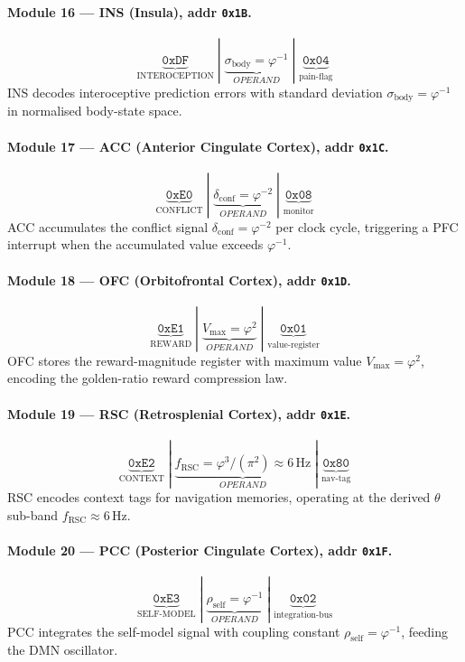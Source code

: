 \paragraph{Module 16 — INS (Insula), addr \texttt{0x1B}.}
\[
  \underbrace{\mathtt{0xDF}}_{\text{INTEROCEPTION}}
  \;|\;
  \underbrace{\sigma_{\text{body}} = \varphi^{-1}}_{OPERAND}
  \;|\;
  \underbrace{\mathtt{0x04}}_{\text{pain-flag}}
\]
INS decodes interoceptive prediction errors with standard
deviation $\sigma_{\text{body}} = \varphi^{-1}$ in normalised body-state
space.

\paragraph{Module 17 — ACC (Anterior Cingulate Cortex), addr \texttt{0x1C}.}
\[
  \underbrace{\mathtt{0xE0}}_{\text{CONFLICT}}
  \;|\;
  \underbrace{\delta_{\text{conf}} = \varphi^{-2}}_{OPERAND}
  \;|\;
  \underbrace{\mathtt{0x08}}_{\text{monitor}}
\]
ACC accumulates the conflict signal $\delta_{\text{conf}} = \varphi^{-2}$
per clock cycle, triggering a PFC interrupt when the accumulated
value exceeds $\varphi^{-1}$.

\paragraph{Module 18 — OFC (Orbitofrontal Cortex), addr \texttt{0x1D}.}
\[
  \underbrace{\mathtt{0xE1}}_{\text{REWARD}}
  \;|\;
  \underbrace{V_{\max} = \varphi^{2}}_{OPERAND}
  \;|\;
  \underbrace{\mathtt{0x01}}_{\text{value-register}}
\]
OFC stores the reward-magnitude register with maximum value
$V_{\max} = \varphi^{2}$, encoding the golden-ratio reward
compression law.

\paragraph{Module 19 — RSC (Retrosplenial Cortex), addr \texttt{0x1E}.}
\[
  \underbrace{\mathtt{0xE2}}_{\text{CONTEXT}}
  \;|\;
  \underbrace{f_{\text{RSC}} = \varphi^{3}/(\pi^{2}) \approx 6\,\text{Hz}}_{OPERAND}
  \;|\;
  \underbrace{\mathtt{0x80}}_{\text{nav-tag}}
\]
RSC encodes context tags for navigation memories, operating at
the derived $\theta$ sub-band $f_{\text{RSC}} \approx 6\,\mathrm{Hz}$.

\paragraph{Module 20 — PCC (Posterior Cingulate Cortex), addr \texttt{0x1F}.}
\[
  \underbrace{\mathtt{0xE3}}_{\text{SELF-MODEL}}
  \;|\;
  \underbrace{\rho_{\text{self}} = \varphi^{-1}}_{OPERAND}
  \;|\;
  \underbrace{\mathtt{0x02}}_{\text{integration-bus}}
\]
PCC integrates the self-model signal with coupling constant
$\rho_{\text{self}} = \varphi^{-1}$, feeding the DMN oscillator.

